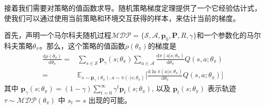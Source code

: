接着我们需要对策略的值函数求导。随机策略梯度定理提供了一个它经验估计式，使我们可以通过使用当前策略和环境交互获得的样本，来估计当前的梯度。
\begin{theorem}
    首先，声明一个马尔科夫随机过程$\mathcal{MDP} = \{\mathcal{S}, \mathcal{A}, \mathbf{p}_0, \mathbf{P}, R, \gamma\}$和一个参数化的马尔科夫策略$\theta_\pi$。那么，这个策略的值函数$\rho(\theta_\pi)$的梯度是
    \begin{equation}
        \begin{aligned}
        \frac{\mathrm{d} \rho(\theta_\pi)}{\mathrm{d} \theta_\pi}
        =& \sum_{s \in \mathcal{S}} \mathbf{p}_{\gamma}(s;\theta_\pi)
        \sum_{a \in \mathcal{A}} \frac{\mathrm{d}\pi(a \vert s; \theta_\pi)}
        {\mathrm{d} \theta_\pi} Q(s, a; \theta_\pi) \\
        =& \mathbb{E}_{s \sim \mathbf{p}_\gamma(\theta_\pi), a \sim \pi(\cdot \vert s; \theta_\pi)}
        \bigg[\frac{\mathrm{d} \ln \pi(a \vert s; \theta_\pi)}
        {\mathrm{d} \theta_\pi} Q(s, a; \theta_\pi)\bigg]
        \end{aligned}
    \end{equation}
    其中 $\mathbf{p}_{\gamma}(s;\theta_\pi) = (1 - \gamma) \sum^{\infty}_{t=0}\gamma^t \mathbf{p}_{t}(s; \theta_\pi)$, 以及 $\mathbf{p}_t(s;\theta_\pi)$ 表示轨迹 $\tau \sim \mathcal{MDP}(\theta_\pi)$ 中 $s_t = s$ 出现的可能。
\end{theorem}

